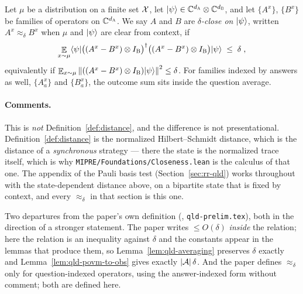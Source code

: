 \begin{definition}
\label{def:state-distance}
\leanok
Let $\mu$ be a distribution on a finite set $\mathcal{X}$, let
$|\psi\rangle \in \mathbb{C}^{d_{\textsc{A}}} \otimes \mathbb{C}^{d_{\textsc{B}}}$, and let $\{A^x\}$, $\{B^x\}$ be families of
operators on $\mathbb{C}^{d_{\textsc{A}}}$. We say $A$ and $B$ are \emph{$\delta$-close on $|\psi\rangle$},
written $A^x \approx_\delta B^x$ when $\mu$ and $|\psi\rangle$ are clear from context, if
\begin{equation*}
  \mathop{\mathbb{E}}_{x \sim \mu} \langle\psi| \bigl( (A^x - B^x) \otimes I_{\textsc{B}} \bigr)^\dagger
    \bigl( (A^x - B^x) \otimes I_{\textsc{B}} \bigr) |\psi\rangle \;\leq\; \delta\;,
\end{equation*}
equivalently if $\mathop{\mathbb{E}}_{x\sim\mu} \left\| {((A^x - B^x) \otimes I_{\textsc{B}})|\psi\rangle} \right\|^2 \leq \delta$. For
families indexed by answers as well, $\{A^x_a\}$ and $\{B^x_a\}$, the outcome sum sits inside the
question average.
\end{definition}

\paragraph{Comments.} This is \emph{not} Definition~\ref{def:distance}, and the difference is
not presentational. Definition~\ref{def:distance} is the normalized Hilbert--Schmidt distance,
which is the distance of a \emph{synchronous} strategy --- there the state is the normalized
trace itself, which is why \texttt{MIPRE/Foundations/Closeness.lean} is the calculus of that one.
The appendix of the Pauli basis test (Section~\ref{sec:rr-qld}) works throughout with the
state-dependent distance above, on a bipartite state that is fixed by context, and every
$\approx_\delta$ in that section is this one.

Two departures from the paper's own definition (\cite{AuditSync26}, \texttt{qld-prelim.tex}),
both in the direction of a stronger statement. The paper writes $\leq O(\delta)$ \emph{inside}
the relation; here the relation is an inequality against $\delta$ and the constants appear in
the lemmas that produce them, so Lemma~\ref{lem:qld-averaging} preserves $\delta$ exactly and
Lemma~\ref{lem:qld-povm-to-obs} gives exactly $\left\vert {\ensuremath{\mathcal{A}}} \right\vert\delta$. And the paper defines
$\approx_\delta$ only for question-indexed operators, using the answer-indexed form without
comment; both are defined here.


